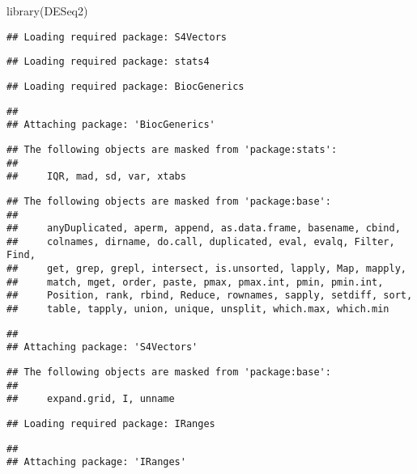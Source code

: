 \documentclass[
]{article}
\newenvironment{Shaded}{\begin{snugshade}}{\end{snugshade}}
\newcommand{\FunctionTok}[1]{\textcolor[rgb]{0.00,0.00,0.00}{#1}}
\newcommand{\NormalTok}[1]{#1}
\begin{document}
\begin{Shaded}
\begin{Highlighting}[]
\FunctionTok{library}\NormalTok{(DESeq2)}
\end{Highlighting}
\end{Shaded}

\begin{verbatim}
## Loading required package: S4Vectors
\end{verbatim}

\begin{verbatim}
## Loading required package: stats4
\end{verbatim}

\begin{verbatim}
## Loading required package: BiocGenerics
\end{verbatim}

\begin{verbatim}
## 
## Attaching package: 'BiocGenerics'
\end{verbatim}

\begin{verbatim}
## The following objects are masked from 'package:stats':
## 
##     IQR, mad, sd, var, xtabs
\end{verbatim}

\begin{verbatim}
## The following objects are masked from 'package:base':
## 
##     anyDuplicated, aperm, append, as.data.frame, basename, cbind,
##     colnames, dirname, do.call, duplicated, eval, evalq, Filter, Find,
##     get, grep, grepl, intersect, is.unsorted, lapply, Map, mapply,
##     match, mget, order, paste, pmax, pmax.int, pmin, pmin.int,
##     Position, rank, rbind, Reduce, rownames, sapply, setdiff, sort,
##     table, tapply, union, unique, unsplit, which.max, which.min
\end{verbatim}

\begin{verbatim}
## 
## Attaching package: 'S4Vectors'
\end{verbatim}

\begin{verbatim}
## The following objects are masked from 'package:base':
## 
##     expand.grid, I, unname
\end{verbatim}

\begin{verbatim}
## Loading required package: IRanges
\end{verbatim}

\begin{verbatim}
## 
## Attaching package: 'IRanges'
\end{verbatim}
\end{document}
